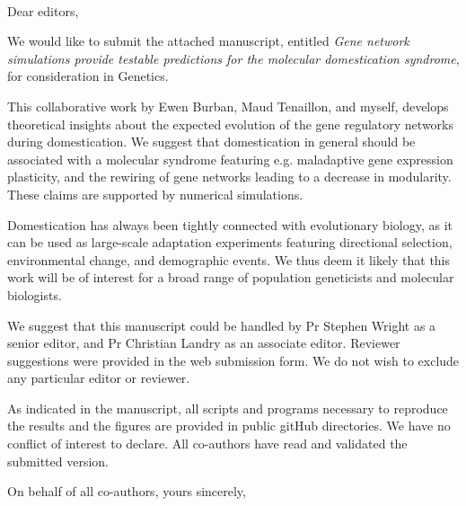\documentclass[12pt]{lettre}
\begin{document}

\begin{letter}{~}

\nodate
\nolieu

\def\concname{Subject:~}

\opening{Dear editors, }


We would like to submit the attached manuscript, entitled \emph{Gene network simulations provide testable predictions for the
molecular domestication syndrome}, for consideration in Genetics. 

This collaborative work by Ewen Burban, Maud Tenaillon, and myself, develops theoretical insights about the expected evolution of the gene regulatory networks during domestication. We suggest that domestication in general should be associated with a molecular syndrome featuring e.g. maladaptive gene expression plasticity, and the rewiring of gene networks leading to a decrease in modularity. These claims are supported by numerical simulations. 

Domestication has always been tightly connected with evolutionary biology, as it can be used as large-scale adaptation experiments featuring directional selection, environmental change, and demographic events.  We thus deem it likely that this work will be of interest for a broad range of population geneticists and molecular biologists. 

We suggest that this manuscript could be handled by Pr Stephen Wright as a senior editor, and Pr Christian Landry as an associate editor. Reviewer suggestions were provided in the web submission form. We do not wish to exclude any particular editor or reviewer. 

As indicated in the manuscript, all scripts and programs necessary to reproduce the results and the figures are provided in public gitHub directories. We have no conflict of interest to declare. All co-authors have read and validated the submitted version. 

\closing{On behalf of all co-authors, yours sincerely,}

\end{letter}
\end{document}
